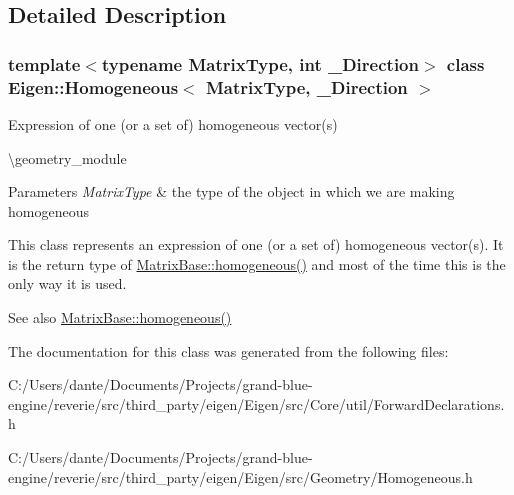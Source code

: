 \subsection{Detailed Description}
\subsubsection*{template$<$typename Matrix\+Type, int \+\_\+\+Direction$>$\newline
class Eigen\+::\+Homogeneous$<$ Matrix\+Type, \+\_\+\+Direction $>$}

Expression of one (or a set of) homogeneous vector(s) 

\textbackslash{}geometry\+\_\+module


\begin{DoxyParams}{Parameters}
{\em Matrix\+Type} & the type of the object in which we are making homogeneous\\
\hline
\end{DoxyParams}
This class represents an expression of one (or a set of) homogeneous vector(s). It is the return type of \mbox{\hyperlink{group___geometry___module_ga8cd24704519bf35e1724e1915d477a35}{Matrix\+Base\+::homogeneous()}} and most of the time this is the only way it is used.

\begin{DoxySeeAlso}{See also}
\mbox{\hyperlink{group___geometry___module_ga8cd24704519bf35e1724e1915d477a35}{Matrix\+Base\+::homogeneous()}} 
\end{DoxySeeAlso}


The documentation for this class was generated from the following files\+:\begin{DoxyCompactItemize}
\item 
C\+:/\+Users/dante/\+Documents/\+Projects/grand-\/blue-\/engine/reverie/src/third\+\_\+party/eigen/\+Eigen/src/\+Core/util/Forward\+Declarations.\+h\item 
C\+:/\+Users/dante/\+Documents/\+Projects/grand-\/blue-\/engine/reverie/src/third\+\_\+party/eigen/\+Eigen/src/\+Geometry/Homogeneous.\+h\end{DoxyCompactItemize}
